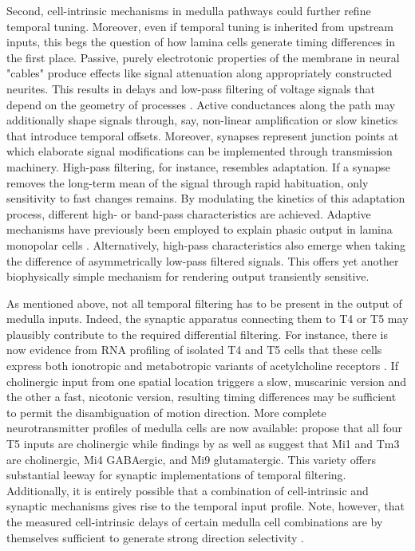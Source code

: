 Second, cell-intrinsic mechanisms in medulla pathways could further refine temporal tuning. Moreover, even if temporal tuning is inherited from upstream inputs, this begs the question of how lamina cells generate timing differences in the first place. Passive, purely electrotonic properties of the membrane in neural "cables" produce effects like signal attenuation along appropriately constructed neurites. This results in delays and low-pass filtering of voltage signals that depend on the geometry of processes \citep{Koch:2004aa}. Active conductances along the path may additionally shape signals through, say, non-linear amplification or slow kinetics that introduce temporal offsets. Moreover, synapses represent junction points at which elaborate signal modifications can be implemented through transmission machinery. High-pass filtering, for instance, resembles adaptation. If a synapse removes the long-term mean of the signal through rapid habituation, only sensitivity to fast changes remains. By modulating the kinetics of this adaptation process, different high- or band-pass characteristics are achieved. Adaptive mechanisms have previously been employed to explain phasic output in lamina monopolar cells \citep{Laughlin:1978aa}. Alternatively, high-pass characteristics also emerge when taking the difference of asymmetrically low-pass filtered signals. This offers yet another biophysically simple mechanism for rendering output transiently sensitive.

As mentioned above, not all temporal filtering has to be present in the output of medulla inputs. Indeed, the synaptic apparatus connecting them to T4 or T5 may plausibly contribute to the required differential filtering. For instance, there is now evidence from RNA profiling of isolated T4 and T5 cells that these cells express both ionotropic and metabotropic variants of acetylcholine receptors \citep{Shinomiya:2014dx,Pankova:2016aa}. If cholinergic input from one spatial location triggers a slow, muscarinic version and the other a fast, nicotonic version, resulting timing differences may be sufficient to permit the disambiguation of motion direction. More complete neurotransmitter profiles of medulla cells are now available: \citet{Shinomiya:2014dx} propose that all four T5 inputs are cholinergic while findings by \citet{Pankova:2017aa} as well as \citet{Takemura:2017aa} suggest that Mi1 and Tm3 are cholinergic, Mi4 GABAergic, and Mi9 glutamatergic. This variety offers substantial leeway for synaptic implementations of temporal filtering. Additionally, it is entirely possible that a combination of cell-intrinsic and synaptic mechanisms gives rise to the temporal input profile. Note, however, that the measured cell-intrinsic delays of certain medulla cell combinations are by themselves sufficient to generate strong direction selectivity \citep{Arenz:2017aa}.

